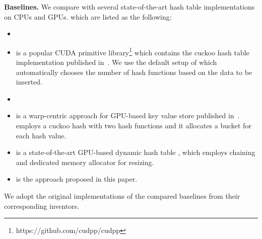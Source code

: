 \vspace{1mm}\noindent\textbf{Baselines.} We compare \voter with several state-of-the-art hash table implementations on CPUs and GPUs. which are listed as the following:
\begin{itemize}
	\item {}
	\item \cudpp is a popular CUDA primitive library\footnote{https://github.com/cudpp/cudpp} which contains the cuckoo hash table implementation published in~\cite{alcantara2009real}.  
	We use the default setup of \cudpp which automatically chooses the number of hash functions based on the data to be inserted.
	\item {}
	\item \megakv is a warp-centric approach for GPU-based key value store published in~\cite{zhang2015mega}. \megakv employs a cuckoo hash with two hash functions and
	it allocates a bucket for each hash value. 
	\item \slab is a state-of-the-art GPU-based dynamic hash table \cite{ashkiani2018dynamic}, which employs chaining and dedicated memory allocator for resizing.
	\item \voter is the approach proposed in this paper.
\end{itemize}
We adopt the original implementations of the compared baselines from their corresponding inventors.


